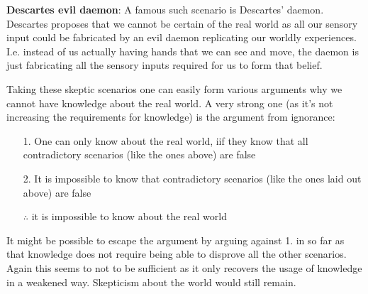 \documentclass[14pt]{article}
\begin{document}
\textbf{Descartes evil daemon}: A famous such scenario is Descartes' daemon. Descartes proposes that we cannot be certain of the real world as all our sensory
input could be fabricated by an evil daemon replicating our worldly experiences. I.e. instead of us actually having hands that we
can see and move, the daemon is just fabricating all the sensory inputs required for us to form that belief.



Taking these skeptic scenarios one can easily form various arguments why we cannot have knowledge about the real world. A very strong one (as it's
not increasing the requirements for knowledge) is the argument from ignorance\autocite[p. 140]{lemos_2007}:

\begin{itemize}
  \item[1.] One can only know about the real world, iif they know that all contradictory scenarios (like the ones above) are false
  \item[2.] It is impossible to know that contradictory scenarios (like the ones laid out above) are false
  \item[$\therefore$] it is impossible to know about the real world
\end{itemize}

It might be possible to escape the argument by arguing against 1. in so far as that knowledge does not require being able
to disprove all the other scenarios. Again this seems to not to be sufficient as it only recovers the usage of knowledge
in a weakened way. Skepticism about the world would still remain.\\
\end{document}
